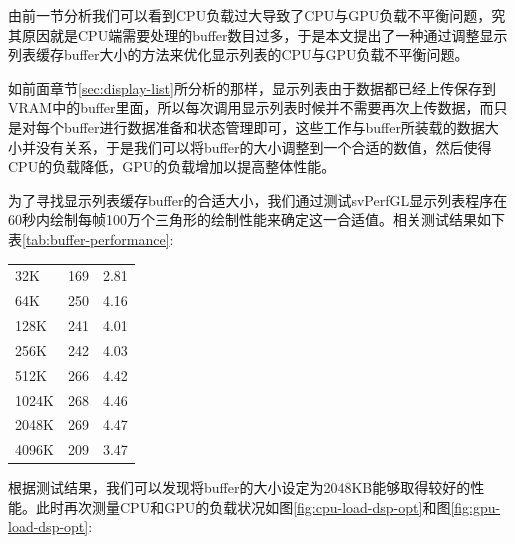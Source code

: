 由前一节分析我们可以看到CPU负载过大导致了CPU与GPU负载不平衡问题，究其原因就是CPU端需要处理的buffer数目过多，于是本文提出了一种通过调整显示列表缓存buffer大小的方法来优化显示列表的CPU与GPU负载不平衡问题。

如前面章节\ref{sec:display-list}所分析的那样，显示列表由于数据都已经上传保存到VRAM中的buffer里面，所以每次调用显示列表时候并不需要再次上传数据，而只是对每个buffer进行数据准备和状态管理即可，这些工作与buffer所装载的数据大小并没有关系，于是我们可以将buffer的大小调整到一个合适的数值，然后使得CPU的负载降低，GPU的负载增加以提高整体性能。

为了寻找显示列表缓存buffer的合适大小，我们通过测试svPerfGL显示列表程序在60秒内绘制每帧100万个三角形的绘制性能来确定这一合适值。相关测试结果如下表\ref{tab:buffer-performance}:

\begin{center}  
\tablelasttail{\bottomrule}

\begin{supertabular}{p{6.cm}p{3.cm}m{6.cm}}
	32K& 169& 2.81\\
	64K& 250& 4.16\\
	128K& 241& 4.01\\
	256K& 242& 4.03\\
	512K& 266& 4.42\\
	1024K& 268& 4.46\\
	2048K& 269& 4.47\\
	4096K& 209& 3.47\\
\end{supertabular}
\end{center}

根据测试结果，我们可以发现将buffer的大小设定为2048KB能够取得较好的性能。此时再次测量CPU和GPU的负载状况如图\ref{fig:cpu-load-dsp-opt}和图\ref{fig:gpu-load-dsp-opt}:

